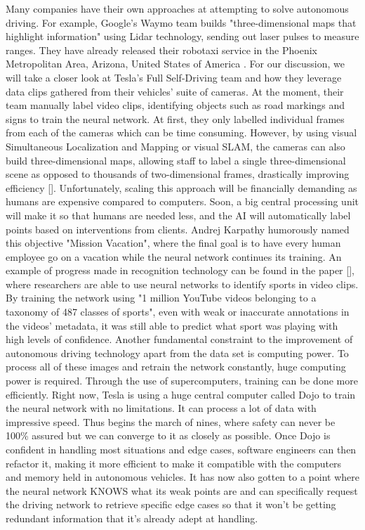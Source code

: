 \documentclass{article}
\begin{document}
Many companies have their own approaches at attempting to solve autonomous driving. For example, Google's Waymo team builds "three-dimensional maps that highlight information" using Lidar technology, sending out laser pulses to measure ranges. They have already released their robotaxi service in the Phoenix Metropolitan Area, Arizona, United States of America \textcite{waymo}. For our discussion, we will take a closer look at Tesla's Full Self-Driving team and how they leverage data clips gathered from their vehicles' suite of cameras. At the moment, their team manually label video clips, identifying objects such as road markings and signs to train the neural network. At first, they only labelled individual frames from each of the cameras which can be time consuming. However, by using visual Simultaneous Localization and Mapping or visual SLAM, the cameras can also build three-dimensional maps, allowing staff to label a single three-dimensional scene as opposed to thousands of two-dimensional frames, drastically improving efficiency [\textcite{durrant2006simultaneous}].
\bigbreak
Unfortunately, scaling this approach will be financially demanding as humans are expensive compared to computers. Soon, a big central processing unit will make it so that humans are needed less, and the AI will automatically label points based on interventions from clients. Andrej Karpathy humorously named this objective "Mission Vacation", where the final goal is to have every human employee go on a vacation while the neural network continues its training. An example of progress made in recognition technology can be found in the paper [\textcite{karpathy2014large}], where researchers are able to use neural networks to identify sports in video clips. By training the network using "1 million YouTube videos belonging to a taxonomy of 487 classes of sports", even with weak or inaccurate annotations in the videos' metadata, it was still able to predict what sport was playing with high levels of confidence.
\bigbreak
Another fundamental constraint to the improvement of autonomous driving technology apart from the data set is computing power. To process all of these images and retrain the network constantly, huge computing power is required. Through the use of supercomputers, training can be done more efficiently.
Right now, Tesla is using a huge central computer called Dojo to train the neural network with no limitations. It can process a lot of data with impressive speed. Thus begins the march of nines, where safety can never be 100\% assured but we can converge to it as closely as possible. Once Dojo is confident in handling most situations and edge cases, software engineers can then refactor it, making it more efficient to make it compatible with the computers and memory held in autonomous vehicles. It has now also gotten to a point where the neural network KNOWS what its weak points are and can specifically request the driving network to retrieve specific edge cases so that it won’t be getting redundant information that it’s already adept at handling. 
\end{document}
